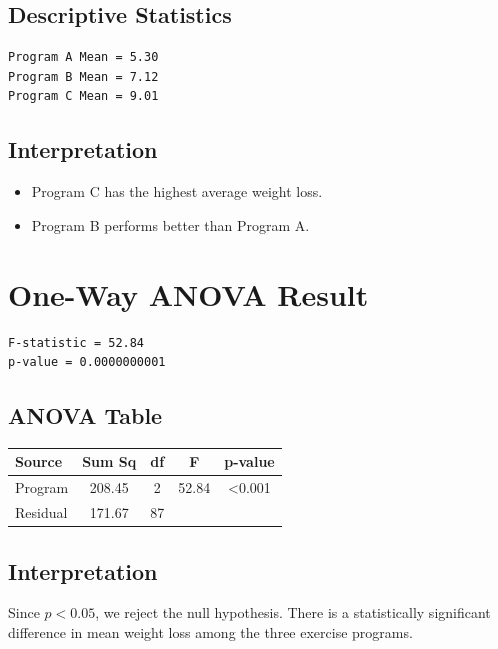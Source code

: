 \documentclass[12pt]{article}
\begin{document}
\subsection*{Descriptive Statistics}

\begin{verbatim}
Program A Mean = 5.30
Program B Mean = 7.12
Program C Mean = 9.01
\end{verbatim}

\subsection*{Interpretation}

\begin{itemize}
    \item Program C has the highest average weight loss.
    \item Program B performs better than Program A.
\end{itemize}

\section*{One-Way ANOVA Result}

\begin{verbatim}
F-statistic = 52.84
p-value = 0.0000000001
\end{verbatim}

\subsection*{ANOVA Table}

\begin{center}
\begin{tabular}{lcccc}
\toprule
Source & Sum Sq & df & F & p-value \\
\midrule
Program & 208.45 & 2 & 52.84 & <0.001 \\
Residual & 171.67 & 87 & & \\
\bottomrule
\end{tabular}
\end{center}

\subsection*{Interpretation}

Since $p < 0.05$, we reject the null hypothesis. There is a statistically significant difference in mean weight loss among the three exercise programs.
\end{document}
